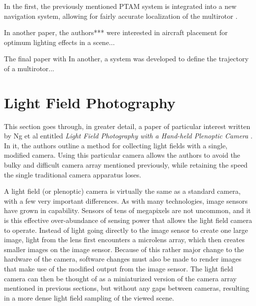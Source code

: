 \documentclass[12pt]{report}
\begin{document}
In the first, the previously mentioned PTAM system is integrated into a new navigation system, allowing for fairly accurate localization of the multirotor \cite{Engel12}.

In another paper, the authors*** were interested in aircraft placement for optimum lighting effects in a scene... \cite{Srikanth14}

The final paper with In another, a system was developed to define the trajectory of a multirotor... \cite{Roberts16}

\section{Light Field Photography}
This section goes through, in greater detail, a paper of particular interest written by Ng et al entitled \emph{Light Field Photography with a Hand-held Plenoptic Camera} \cite{Ng05}. In it, the authors outline a method for collecting light fields with a single, modified camera. Using this particular camera allows the authors to avoid the bulky and difficult camera array mentioned previously, while retaining the speed the single traditional camera apparatus loses.

A light field (or plenoptic) camera is virtually the same as a standard camera, with a few very important differences. As with many technologies, image sensors have grown in capability. Sensors of tens of megapixels are not uncommon, and it is this effective over-abundance of sensing power that allows the light field camera to operate. Instead of light going directly to the image sensor to create one large image, light from the lens first encounters a microlens array, which then creates smaller images on the image sensor. Because of this rather major change to the hardware of the camera, software changes must also be made to render images that make use of the modified output from the image sensor. The light field camera can then be thought of as a miniaturized version of the camera array mentioned in previous sections, but without any gaps between cameras, resulting in a more dense light field sampling of the viewed scene.
\end{document}
